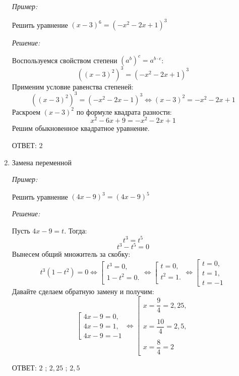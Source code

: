 \documentclass[12pt, a4paper]{article}
\begin{document}
\begin{enumerate}
	\textit{Пример:}
	
	Решить уравнение $(x-3)^6=(-x^2-2x+1)^3$
	
	\textit{Решение:}
	
	Воспользуемся свойством степени $(a^b)^c=a^{b\cdot c}$:
	$$((x-3)^2)^3=(-x^2-2x+1)^3$$
	Применим условие равенства степеней:
	$$((x-3)^2)^3=(-x^2-2x-1)^3\Leftrightarrow (x-3)^2=-x^2-2x+1$$
	Раскроем $(x-3)^2$ по формуле квадрата разности:
	$$x^2-6x+9=-x^2-2x+1$$
	Решим обыкновенное квадратное уравнение.
	
	ОТВЕТ: $2$
	\item Замена переменной
	
	\textit{Пример:}
	
	Решить уравнение $(4x-9)^3=(4x-9)^5$
	
	\textit{Решение:}
	
	Пусть $4x-9 = t$. Тогда:
	$$t^3=t^5$$
	$$t^3-t^5=0$$
	Вынесем общий множитель за скобку:
	$$t^3(1-t^2)=0
	\Leftrightarrow
	\left[
	\begin{array}{l}
		t^3=0,\\
		1-t^2=0.\\
	\end{array}
	\right.
	\Leftrightarrow
	\left[
	\begin{array}{l}
		t=0,\\
		t^2=1.\\
	\end{array}
	\right.
	\Leftrightarrow
	\left[
	\begin{array}{l}
		t=0,\\
		t=1,\\
		t=-1
	\end{array}
	\right.$$
	Давайте сделаем обратную замену и получим:
	$$\left[
	\begin{array}{l}
		4x-9=0,\\
		4x-9=1,\\
		4x-9=-1
	\end{array}
	\right.
	\Leftrightarrow
	\left[
	\begin{array}{l}
		x=\dfrac{9}{4}=2,25,\\\\
		x=\dfrac{10}{4}=2,5,\\\\
		x=\dfrac{8}{4}=2
	\end{array}
	\right.$$
	
	ОТВЕТ: $2$ ; $2,25$ ; $2,5$
\end{enumerate}
\end{document}
